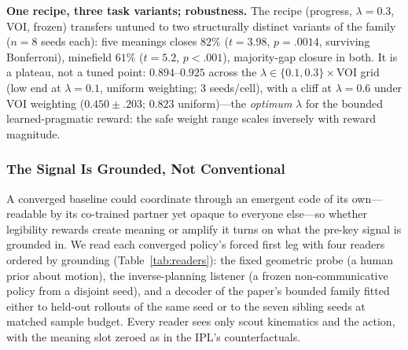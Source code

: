 \documentclass[sigconf,review,anonymous]{acmart}
\begin{document}
\textbf{One recipe, three task variants; robustness.} The recipe (progress, $\lambda{=}0.3$, VOI, frozen) transfers untuned to two structurally distinct variants of the family ($n{=}8$ seeds each): five meanings closes $82\%$ ($t=3.98$, $p=.0014$, surviving Bonferroni), minefield $61\%$ ($t=5.2$, $p<.001$), majority-gap closure in both. It is a plateau, not a tuned point: $0.894$--$0.925$ across the $\lambda \in \{0.1,0.3\}\times$VOI grid (low end at $\lambda{=}0.1$, uniform weighting; 3 seeds/cell), with a cliff at $\lambda{=}0.6$ under VOI weighting ($0.450\pm.203$; $0.823$ uniform)---the \emph{optimum} $\lambda$ for the bounded learned-pragmatic reward: the safe weight range scales inversely with reward magnitude.

\subsubsection{The Signal Is Grounded, Not Conventional}
\label{ssec:readers}

A converged baseline could coordinate through an emergent code of its own---readable by its co-trained partner yet opaque to everyone else---so whether legibility rewards create meaning or amplify it turns on what the pre-key signal is grounded in. We read each converged policy's forced first leg with four readers ordered by grounding (Table~\ref{tab:readers}): the fixed geometric probe (a human prior about motion), the inverse-planning listener (a frozen non-communicative policy from a disjoint seed), and a decoder of the paper's bounded family fitted either to held-out rollouts of the same seed or to the seven sibling seeds at matched sample budget. Every reader sees only scout kinematics and the action, with the meaning slot zeroed as in the IPL's counterfactuals.
\end{document}
